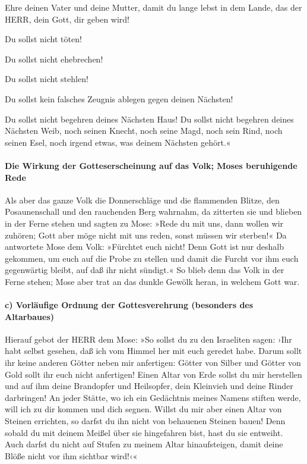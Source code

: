  Ehre deinen Vater und deine Mutter, damit du lange lebst
in dem Lande, das der HERR, dein Gott, dir geben wird!

 Du sollst nicht töten!

 Du sollst nicht ehebrechen!

 Du sollst nicht stehlen!

 Du sollst kein falsches Zeugnis ablegen gegen deinen
Nächsten!

 Du sollst nicht begehren deines Nächsten Haus! Du sollst
nicht begehren deines Nächsten Weib, noch seinen Knecht, noch seine
Magd, noch sein Rind, noch seinen Esel, noch irgend etwas, was deinem
Nächsten gehört.«

\hypertarget{die-wirkung-der-gotteserscheinung-auf-das-volk-moses-beruhigende-rede}{%
\paragraph{Die Wirkung der Gotteserscheinung auf das Volk; Moses
beruhigende
Rede}\label{die-wirkung-der-gotteserscheinung-auf-das-volk-moses-beruhigende-rede}}

 Als aber das ganze Volk die Donnerschläge und die
flammenden Blitze, den Posaunenschall und den rauchenden Berg wahrnahm,
da zitterten sie und blieben in der Ferne stehen  und
sagten zu Mose: »Rede du mit uns, dann wollen wir zuhören; Gott aber
möge nicht mit uns reden, sonst müssen wir sterben!«  Da
antwortete Mose dem Volk: »Fürchtet euch nicht! Denn Gott ist nur
deshalb gekommen, um euch auf die Probe zu stellen und damit die Furcht
vor ihm euch gegenwärtig bleibt, auf daß ihr nicht sündigt.«
 So blieb denn das Volk in der Ferne stehen; Mose aber
trat an das dunkle Gewölk heran, in welchem Gott war.

\hypertarget{c-vorluxe4ufige-ordnung-der-gottesverehrung-besonders-des-altarbaues}{%
\paragraph{c) Vorläufige Ordnung der Gottesverehrung (besonders des
Altarbaues)}\label{c-vorluxe4ufige-ordnung-der-gottesverehrung-besonders-des-altarbaues}}

 Hierauf gebot der HERR dem Mose: »So sollst du zu den
Israeliten sagen: ›Ihr habt selbst gesehen, daß ich vom Himmel her mit
euch geredet habe.  Darum sollt ihr keine anderen Götter
neben mir anfertigen: Götter von Silber und Götter von Gold sollt ihr
euch nicht anfertigen!  Einen Altar von Erde sollst du
mir herstellen und auf ihm deine Brandopfer und Heilsopfer, dein
Kleinvieh und deine Rinder darbringen! An jeder Stätte, wo ich ein
Gedächtnis meines Namens stiften werde, will ich zu dir kommen und dich
segnen.  Willst du mir aber einen Altar von Steinen
errichten, so darfst du ihn nicht von behauenen Steinen bauen! Denn
sobald du mit deinem Meißel über sie hingefahren bist, hast du sie
entweiht.  Auch darfst du nicht auf Stufen zu meinem
Altar hinaufsteigen, damit deine Blöße nicht vor ihm sichtbar wird!‹«

